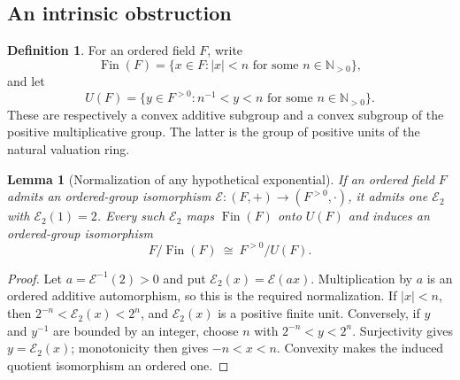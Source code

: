 \documentclass[11pt,letterpaper]{article}
\numberwithin{equation}{section}
\newtheorem{lemma}[theorem]{Lemma}
\theoremstyle{definition}
\newtheorem{definition}[theorem]{Definition}
\theoremstyle{remark}
\newcommand{\N}{\mathbb N}
\newcommand{\Fin}{\operatorname{Fin}}
\begin{document}
\subsection{An intrinsic obstruction}
\begin{definition}\label{fkc:sb:def:fin}
For an ordered field $F$, write
\[
 \Fin(F)=\{x\in F:|x|<n\text{ for some }n\in\N_{>0}\},
\]
and let
\[
 U(F)=\{y\in F^{>0}:n^{-1}<y<n
                       \text{ for some }n\in\N_{>0}\}.
\]
These are respectively a convex additive subgroup and a convex subgroup of the positive multiplicative group. The latter is the group of positive units of the natural valuation ring.
\end{definition}

\begin{lemma}[Normalization of any hypothetical exponential]\label{fkc:sb:lem:normalize}
If an ordered field $F$ admits an ordered-group isomorphism $\mathcal E:(F,+)\to(F^{>0},\cdot)$, it admits one $\mathcal E_2$ with $\mathcal E_2(1)=2$. Every such $\mathcal E_2$ maps $\Fin(F)$ onto $U(F)$ and induces an ordered-group isomorphism
\[
 F/\Fin(F)\ \cong\ F^{>0}/U(F).
\]
\end{lemma}
\begin{proof}
Let $a=\mathcal E^{-1}(2)>0$ and put $\mathcal E_2(x)=\mathcal E(ax)$. Multiplication by $a$ is an ordered additive automorphism, so this is the required normalization. If $|x|<n$, then $2^{-n}<\mathcal E_2(x)<2^n$, and $\mathcal E_2(x)$ is a positive finite unit. Conversely, if $y$ and $y^{-1}$ are bounded by an integer, choose $n$ with $2^{-n}<y<2^n$. Surjectivity gives $y=\mathcal E_2(x)$; monotonicity then gives $-n<x<n$. Convexity makes the induced quotient isomorphism an ordered one.
\end{proof}
\end{document}
